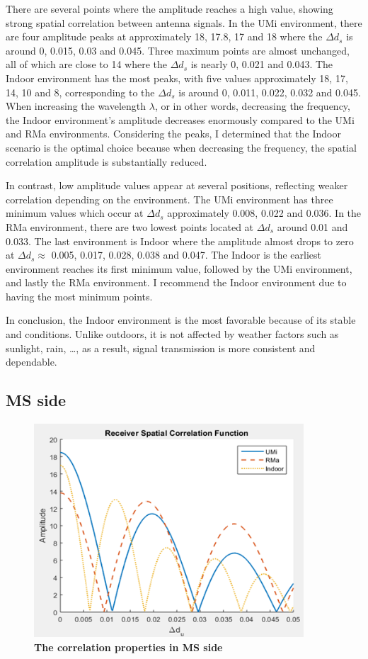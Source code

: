 \documentclass{article} %
\begin{document}
There are several points where the amplitude reaches a high value, showing strong spatial correlation between antenna signals. In the UMi environment, there are four amplitude peaks at approximately 18, 17.8, 17 and 18 where the $\Delta d_s$ is around 0, 0.015, 0.03 and 0.045. Three maximum points are almost unchanged, all of which are close to 14 where the $\Delta d_s$ is nearly 0, 0.021 and 0.043. The Indoor environment has the most peaks, with five values approximately 18, 17, 14, 10 and 8, corresponding to the $\Delta d_s$ is around 0, 0.011, 0.022, 0.032 and 0.045. When increasing the wavelength $\lambda$, or in other words, decreasing the frequency, the Indoor environment’s amplitude decreases enormously compared to the UMi and RMa environments. Considering the peaks, I determined that the Indoor scenario is the optimal choice because when decreasing the frequency, the spatial correlation amplitude is substantially reduced.

In contrast, low amplitude values appear at several positions, reflecting weaker correlation depending on the environment. The UMi environment has three minimum values which occur at $\Delta d_s$ approximately 0.008, 0.022 and 0.036. In the RMa environment, there are two lowest points located at $\Delta d_s$ around 0.01 and 0.033. The last environment is Indoor where the amplitude almost drops to zero at $\Delta d_s \approx$ 0.005, 0.017, 0.028, 0.038 and 0.047. The Indoor is the earliest environment reaches its first minimum value, followed by the UMi environment, and lastly the RMa environment. I recommend the Indoor environment due to having the most minimum points.

In conclusion, the Indoor environment is the most favorable because of its stable and conditions. Unlike outdoors, it is not affected by weather factors such as sunlight, rain, \dots, as a result, signal transmission is more consistent and dependable.

\subsection{MS side}

\begin{figure}[!ht]
    \centering
    \includegraphics[height=8cm]{Images/figure3.png}
    \caption[The correlation properties in MS side~\cite{final_exam}]{\bfseries \fontsize{12pt}{0pt}\selectfont The correlation properties in MS side~\cite{final_exam}}
    \label{figure3}
\end{figure}
\end{document}
